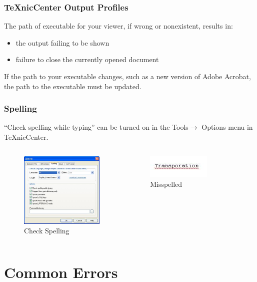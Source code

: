 \documentclass{beamer}
\begin{document}
\begin{frame}
\frametitle{TeXnicCenter Output Profiles}
The path of executable for your viewer, if wrong or nonexistent, results in:

\begin{itemize}
\item the output failing to be shown
\item failure to close the currently opened document
\end{itemize}

If the path to your executable changes, such as a new version of Adobe Acrobat, the path to the executable must be updated.

\end{frame}

\begin{frame}
\frametitle{Spelling}
``Check spelling while typing'' can be turned on in the Tools$\rightarrow$ Options menu in TeXnicCenter.

\begin{columns}

\begin{figure}[htbp]
\centering
\includegraphics[width=4cm]{spelling.jpg}
\caption{Check Spelling}
\label{fig::spelling}
\end{figure}


\begin{figure}[htbp]
\centering
\includegraphics[width=3cm]{misspelled.jpg}
\caption{Misspelled}
\label{fig::misspelled}
\end{figure}

\end{columns}

\end{frame}

\section{Common Errors}
\end{document}
